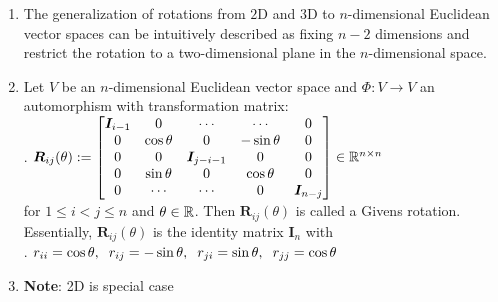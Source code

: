 \begin{enumerate}
    \item The generalization of rotations from $2$D and $3$D to $n$-dimensional Euclidean vector spaces can be intuitively described as fixing $n - 2$ dimensions and restrict the rotation to a two-dimensional plane in the $n$-dimensional space.

    \item
    \begin{definition}
        Let $V$ be an $n$-dimensional Euclidean vector space and $\Phi : V \to V$ an automorphism with transformation matrix:
        \\
        .\hfill
        $
            \bm{R}_{ij} (\theta) :=
            \begin{bmatrix}
                \bm{I}_{i-1} & 0 & \cdots &  \cdots & 0 \\
                0 & \cos \theta & 0 & - \sin \theta & 0\\
                0 & 0 & \bm{I}_{j-i-1} & 0 & 0\\
                0 & \sin \theta &  0 & \cos \theta & 0\\
                0 & \cdots & \cdots & 0 & \bm{I}_{n-j}
            \end{bmatrix}
            \in \mathbb{R}^{n\times n}
        $
        \hfill \cite{mfml/book/mml/Deisenroth-Faisal-Ong}
        \\
        for $1 \leq i < j \leq n$ and $\theta \in \mathbb{R}$.
        Then $\bm{R}_{ij} (\theta)$ is called a Givens rotation.
        Essentially, $\bm{R}_{ij} (\theta)$ is the identity matrix $\bm{I}_n$ with
        \hfill \cite{mfml/book/mml/Deisenroth-Faisal-Ong}
        \\
        .\hfill
        $
            r_{ii} = \cos \theta ,
            \hspace{0.2cm}
            r_{ij} = - \sin \theta,
            \hspace{0.2cm}
            r_{ji} = \sin \theta,
            \hspace{0.2cm}
            r_{jj} = \cos \theta
        $
        \hfill \cite{mfml/book/mml/Deisenroth-Faisal-Ong}
    \end{definition}

    \item \textbf{Note}: 2D is special case
\end{enumerate}






























